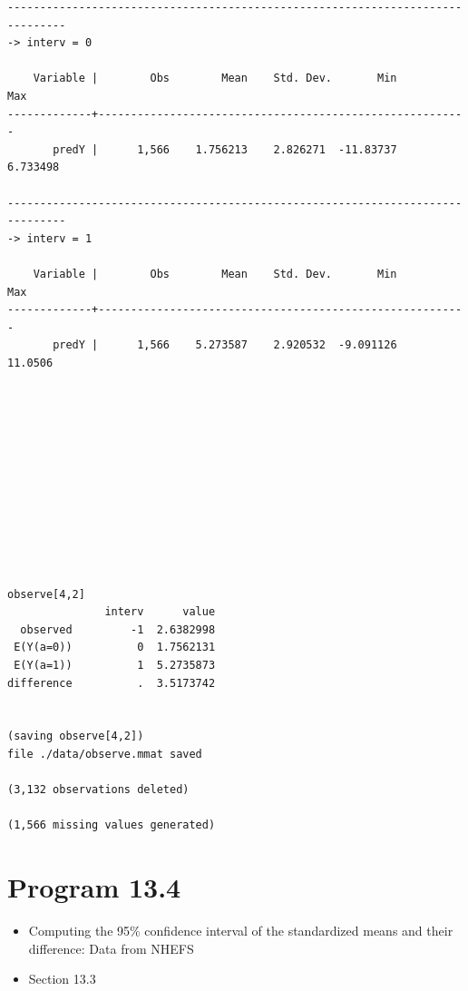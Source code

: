 \documentclass[
  10pt,
]{book}
\providecommand{\tightlist}{%
  \setlength{\itemsep}{0pt}\setlength{\parskip}{0pt}}
\begin{document}
\begin{verbatim}
-------------------------------------------------------------------------------
-> interv = 0

    Variable |        Obs        Mean    Std. Dev.       Min        Max
-------------+---------------------------------------------------------
       predY |      1,566    1.756213    2.826271  -11.83737   6.733498

-------------------------------------------------------------------------------
-> interv = 1

    Variable |        Obs        Mean    Std. Dev.       Min        Max
-------------+---------------------------------------------------------
       predY |      1,566    5.273587    2.920532  -9.091126    11.0506












observe[4,2]
               interv      value
  observed         -1  2.6382998
 E(Y(a=0))          0  1.7562131
 E(Y(a=1))          1  5.2735873
difference          .  3.5173742


(saving observe[4,2])
file ./data/observe.mmat saved

(3,132 observations deleted)

(1,566 missing values generated)
\end{verbatim}

\hypertarget{program-13.4}{%
\section{Program 13.4}\label{program-13.4}}

\begin{itemize}
\tightlist
\item
  Computing the 95\% confidence interval of the standardized means and their difference: Data from NHEFS
\item
  Section 13.3
\end{itemize}
\end{document}
